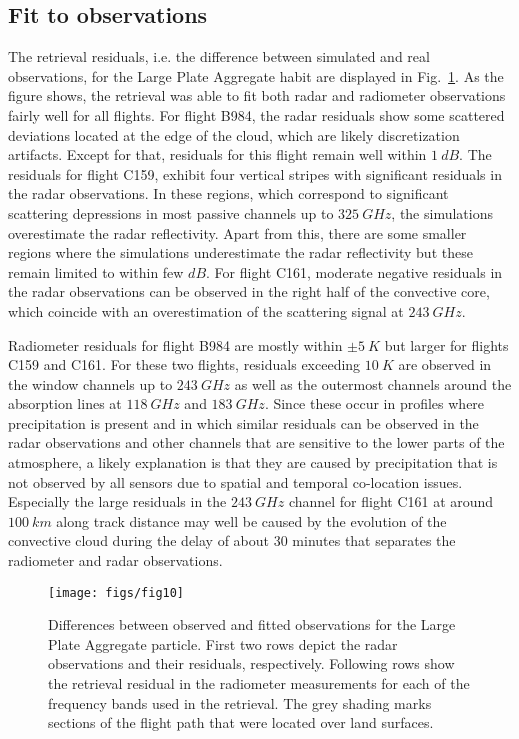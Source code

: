 \documentclass[journal abbreviation, manuscript]{copernicus}
\begin{document}
\subsection{Fit to observations}

The retrieval residuals, i.e. the difference between simulated and real
observations, for the Large Plate Aggregate habit are displayed in
Fig.~\ref{fig:residuals}. As the figure shows, the retrieval was able to fit
both radar and radiometer observations fairly well for all flights. For flight
B984, the radar residuals show some scattered deviations located at the edge of
the cloud, which are likely discretization artifacts. Except for that, residuals
for this flight remain well within $1\ \unit{dB}$. The residuals for flight
C159, exhibit four vertical stripes with significant residuals in the radar
observations. In these regions, which correspond to significant scattering
depressions in most passive channels up to $325\ \unit{GHz}$, the simulations
overestimate the radar reflectivity. Apart from this, there are some smaller
regions where the simulations underestimate the radar reflectivity but these
remain limited to within few $\unit{dB}$. For flight C161, moderate negative
residuals in the radar observations can be observed in the right half of the
convective core, which coincide with an overestimation of the scattering signal
at $243\ \unit{GHz}$.

Radiometer residuals for flight B984 are mostly within $\pm 5\ \unit{K}$ but
larger for flights C159 and C161. For these two flights, residuals exceeding
$10\ \unit{K}$ are observed in the window channels up to $243\ \unit{GHz}$ as
well as the outermost channels around the absorption lines at $118\ \unit{GHz}$
and $183\ \unit{GHz}$. Since these occur in profiles where precipitation is
present and in which similar residuals can be observed in the radar observations
and other channels that are sensitive to the lower parts of the atmosphere, a
likely explanation is that they are caused by precipitation that is not observed
by all sensors due to spatial and temporal co-location issues. Especially the
large residuals in the $243\ \unit{GHz}$ channel for flight C161 at around
$100\ \unit{km}$ along track distance may well be caused by the evolution of the
convective cloud during the delay of about 30 minutes that separates the
radiometer and radar observations.

\begin{figure}[!hbpt]
  \centering
  \texttt{[image: figs/fig10]}
  \caption{Differences between observed and fitted observations for the Large
    Plate Aggregate particle. First two rows depict the radar observations and
    their residuals, respectively. Following rows show the retrieval residual in
    the radiometer measurements for each of the frequency bands used in the
    retrieval. The grey shading marks sections of the flight path that were
    located over land surfaces. }
  \label{fig:residuals}
\end{figure}
\end{document}
